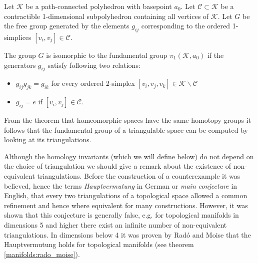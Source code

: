 


    \begin{theorem}
        Let $\mathcal{K}$ be a path-connected polyhedron with basepoint $a_0$. Let $\mathcal{C}\subset\mathcal{K}$ be a contractible 1-dimensional subpolyhedron containing all vertices of $\mathcal{K}$. Let $G$ be the free group generated by the elements $g_{ij}$ corresponding to the ordered 1-simplices $[v_i,v_j]\in\mathcal{C}$.

        The group $G$ is isomorphic to the fundamental group $\pi_1(\mathcal{K}, a_0)$ if the generators $g_{ij}$ satisfy following two relations:
        \begin{itemize}
            \item $g_{ij}g_{jk} = g_{ik}$ for every ordered 2-simplex $[v_i,v_j,v_k]\in\mathcal{K}\backslash\mathcal{C}$
            \item $g_{ij} = e$ if $[v_i,v_j]\in\mathcal{C}$.
        \end{itemize}
    \end{theorem}
    \begin{result}
        From the theorem that homeomorphic spaces have the same homotopy groups it follows that the fundamental group of a triangulable space can be computed by looking at its triangulations.
    \end{result}

    \begin{remark}
        Although the homology invariants (which we will define below) do not depend on the choice of triangulation we should give a remark about the existence of non-equivalent triangulations. Before the construction of a counterexample it was believed, hence the terms \textit{Hauptvermutung} in German or \textit{main conjecture} in English, that every two triangulations of a topological space allowed a common refinement and hence where equivalent for many constructions. However, it was shown that this conjecture is generally false, e.g. for topological manifolds in dimensions 5 and higher there exist an infinite number of non-equivalent triangulations. In dimensions below 4 it was proven by Rad\'o and Moise that the Hauptvermutung holds for topological manifolds (see theorem \ref{manifolds:rado_moise}).
    \end{remark}


